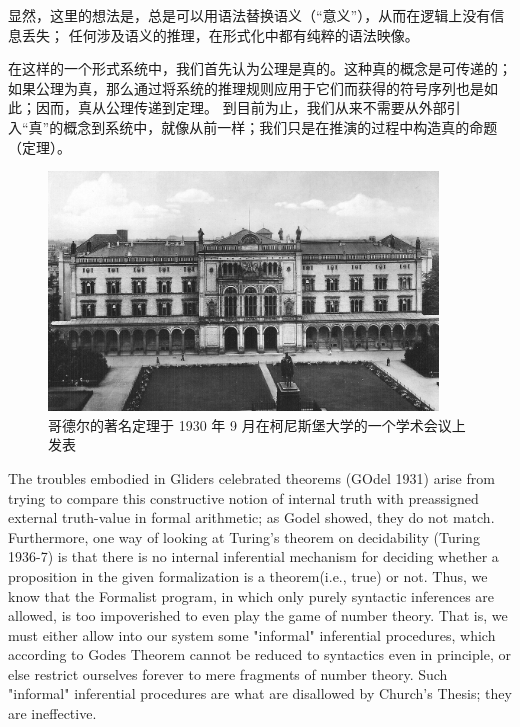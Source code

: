 \documentclass[a4paper,12pt]{article}
\begin{document}
显然，这里的想法是，总是可以用语法替换语义（“意义”），从而在逻辑上没有信息丢失；
任何涉及语义的推理，在形式化中都有纯粹的语法映像。

在这样的一个形式系统中，我们首先认为公理是真的。这种真的概念是可传递的；
如果公理为真，那么通过将系统的推理规则应用于它们而获得的符号序列也是如此；因而，真从公理传递到定理。
到目前为止，我们从来不需要从外部引入“真”的概念到系统中，就像从前一样；我们只是在推演的过程中构造真的命题（定理）。

\begin{figure}[ht]
\centering
\includegraphics[height=2.5in]{images/konigsberger_university.jpg}
\caption{哥德尔的著名定理于 1930 年 9 月在柯尼斯堡大学的一个学术会议上发表}
\end{figure}


The troubles embodied in Gliders celebrated theorems (GOdel 1931)
arise from trying to compare this constructive notion of internal truth with
preassigned external truth-value in formal arithmetic; as Godel showed, they
do not match. Furthermore, one way of looking at Turing's theorem on decidability (Turing 1936-7)
is that there is no internal inferential mechanism for deciding whether a proposition
in the given formalization is a theorem(i.e., true) or not. Thus, we know that the Formalist program,
in which only purely syntactic inferences are allowed, is too impoverished to even play the game of number theory.
That is, we must either allow into our system some "informal" inferential procedures, which according to Godes Theorem
cannot be reduced to syntactics even in principle, or else restrict ourselves forever to mere fragments of number theory.
Such "informal" inferential procedures are what are disallowed by Church's Thesis; they are ineffective.
\end{document}
